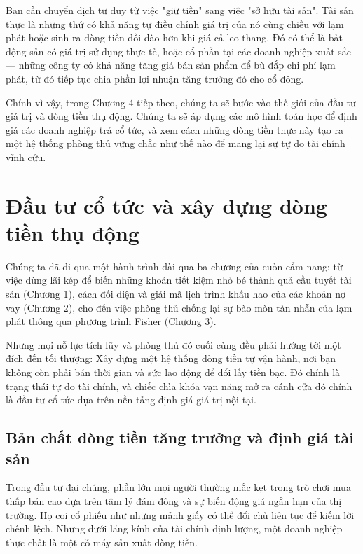 \documentclass[14pt, a4paper, oneside]{extreport}
\begin{document}
Bạn cần chuyển dịch tư duy từ việc "giữ tiền" sang việc "sở hữu tài sản". Tài sản thực là những thứ có khả năng tự điều chỉnh giá trị của nó cùng chiều với lạm phát hoặc sinh ra dòng tiền dồi dào hơn khi giá cả leo thang. Đó có thể là bất động sản có giá trị sử dụng thực tế, hoặc cổ phần tại các doanh nghiệp xuất sắc --- những công ty có khả năng tăng giá bán sản phẩm để bù đắp chi phí lạm phát, từ đó tiếp tục chia phần lợi nhuận tăng trưởng đó cho cổ đông.

Chính vì vậy, trong Chương 4 tiếp theo, chúng ta sẽ bước vào thế giới của đầu tư giá trị và dòng tiền thụ động. Chúng ta sẽ áp dụng các mô hình toán học để định giá các doanh nghiệp trả cổ tức, và xem cách những dòng tiền thực này tạo ra một hệ thống phòng thủ vững chắc như thế nào để mang lại sự tự do tài chính vĩnh cửu.

\chapter{Đầu tư cổ tức và xây dựng dòng tiền thụ động}

Chúng ta đã đi qua một hành trình dài qua ba chương của cuốn cẩm nang: từ việc dùng lãi kép để biến những khoản tiết kiệm nhỏ bé thành quả cầu tuyết tài sản (Chương 1), cách đối diện và giải mã lịch trình khấu hao của các khoản nợ vay (Chương 2), cho đến việc phòng thủ chống lại sự bào mòn tàn nhẫn của lạm phát thông qua phương trình Fisher (Chương 3). 

Nhưng mọi nỗ lực tích lũy và phòng thủ đó cuối cùng đều phải hướng tới một đích đến tối thượng: Xây dựng một hệ thống dòng tiền tự vận hành, nơi bạn không còn phải bán thời gian và sức lao động để đổi lấy tiền bạc. Đó chính là trạng thái tự do tài chính, và chiếc chìa khóa vạn năng mở ra cánh cửa đó chính là đầu tư cổ tức dựa trên nền tảng định giá giá trị nội tại.

\section{Bản chất dòng tiền tăng trưởng và định giá tài sản}

Trong đầu tư đại chúng, phần lớn mọi người thường mắc kẹt trong trò chơi mua thấp bán cao dựa trên tâm lý đám đông và sự biến động giá ngắn hạn của thị trường. Họ coi cổ phiếu như những mảnh giấy có thể đổi chủ liên tục để kiếm lời chênh lệch. Nhưng dưới lăng kính của tài chính định lượng, một doanh nghiệp thực chất là một cỗ máy sản xuất dòng tiền. 
\end{document}
